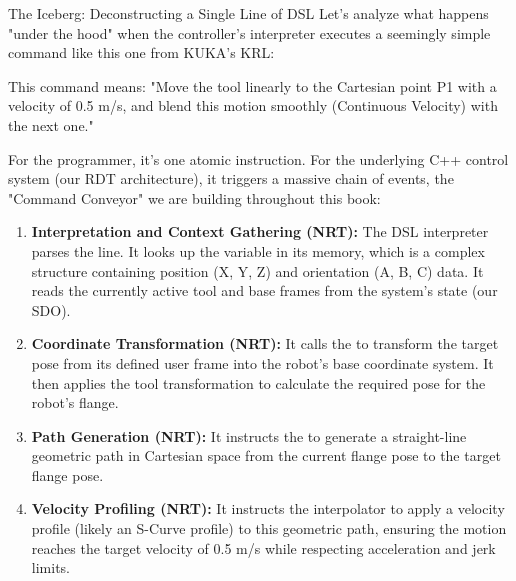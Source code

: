 \begin{principlebox}{The Iceberg: Deconstructing a Single Line of DSL}
    Let's analyze what happens "under the hood" when the controller's interpreter executes a seemingly simple command like this one from KUKA's KRL:
    
    
    This command means: "Move the tool linearly to the Cartesian point P1 with a velocity of 0.5 m/s, and blend this motion smoothly (Continuous Velocity) with the next one."
    
    For the programmer, it's one atomic instruction. For the underlying C++ control system (our RDT architecture), it triggers a massive chain of events, the "Command Conveyor" we are building throughout this book:
    
    \begin{enumerate}
        \item \textbf{Interpretation and Context Gathering (NRT):} The DSL interpreter parses the line. It looks up the variable  in its memory, which is a complex structure containing position (X, Y, Z) and orientation (A, B, C) data. It reads the currently active tool and base frames from the system's state (our SDO).
        
        \item \textbf{Coordinate Transformation (NRT):} It calls the  to transform the target pose  from its defined user frame into the robot's base coordinate system. It then applies the tool transformation to calculate the required pose for the robot's flange.
        
        \item \textbf{Path Generation (NRT):} It instructs the  to generate a straight-line geometric path in Cartesian space from the current flange pose to the target flange pose.
        
        \item \textbf{Velocity Profiling (NRT):} It instructs the interpolator to apply a velocity profile (likely an S-Curve profile) to this geometric path, ensuring the motion reaches the target velocity of 0.5 m/s while respecting acceleration and jerk limits.
        

\end{enumerate}
\end{principlebox}
